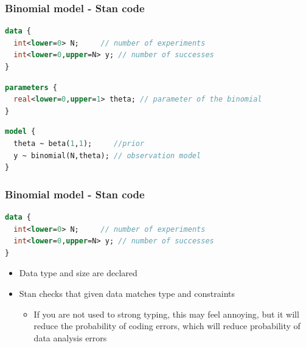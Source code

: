 \documentclass[10pt]{beamer}
\begin{document}
\begin{frame}[fragile]

\frametitle{Binomial model - Stan code}
  {\small\color{gray}
{
  \begin{lstlisting}[language=Stan,basicstyle=\ttfamily]
data {
  int<lower=0> N;     // number of experiments
  int<lower=0,upper=N> y; // number of successes
}
\end{lstlisting}}
  {
\begin{lstlisting}[language=Stan]
parameters {
  real<lower=0,upper=1> theta; // parameter of the binomial
}
\end{lstlisting}}
{
\begin{lstlisting}[language=Stan]
model {
  theta ~ beta(1,1);     //prior
  y ~ binomial(N,theta); // observation model
}
\end{lstlisting}
}}
\end{frame}

\begin{frame}[fragile]

\frametitle{Binomial model - Stan code}

  {\small
  \begin{lstlisting}[language=Stan]
data {
  int<lower=0> N;     // number of experiments
  int<lower=0,upper=N> y; // number of successes
}
\end{lstlisting}}

  \begin{itemize}
  \item Data type and size are declared
  \item Stan checks that given data matches type and constraints
    \begin{itemize}
    \item<2-> If you are not used to strong typing, this may
      feel annoying, but it will reduce the probability of coding
      errors, which will reduce probability of data analysis errors
    \end{itemize}
  \end{itemize}
\end{frame}
\end{document}
